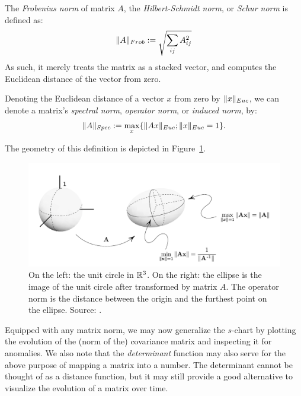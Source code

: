\begin{definition}
The \emph{Frobenius norm} of matrix $A$, \aka the \emph{Hilbert-Schmidt norm}, or \emph{Schur norm} is defined as:
\begin{align}
	\Vert A \Vert_{Frob}:= \sqrt{\sum_{ij} A_{ij}^2} 
\end{align}
As such, it merely treats the matrix as a stacked vector, and computes the Euclidean distance of the vector from zero.
\end{definition}





\begin{definition}
Denoting the Euclidean distance of a vector $x$ from zero by $\Vert x \Vert_{Euc}$, we can denote a matrix's \emph{spectral norm}, \aka \emph{operator norm}, or \emph{induced norm}, by: 
\begin{align}
	\Vert A \Vert_{Spec} := \max_x \{ \Vert Ax \Vert_{Euc}; \Vert x \Vert_{Euc}=1 \}.
\end{align}
\end{definition}

The geometry of this definition is depicted in Figure~\ref{fig:operator_norm}.

\begin{figure}
\centering
\includegraphics[width=0.7\linewidth]{art/operator_norm}
\caption[Geometry of Spectral Matrix Norms]{
\footnotesize
On the left: the unit circle in $\mathbb{R}^3$. 
On the right: the ellipse is the image of the unit circle after transformed by matrix $A$. The operator norm is the distance between the origin and the furthest point on the ellipse. 
\newline Source: \cite{meyer_matrix_2001}.}
\label{fig:operator_norm}
\end{figure}



Equipped with any matrix norm, we may now generalize the $s$-chart by plotting the evolution of the (norm of the) covariance matrix and inspecting it for anomalies. 
We also note that the \emph{determinant} function may also serve for the above purpose of mapping a matrix into a number. The determinant cannot be thought of as a distance function, but it may still provide a good alternative to visualize the evolution of a matrix over time. 
 
